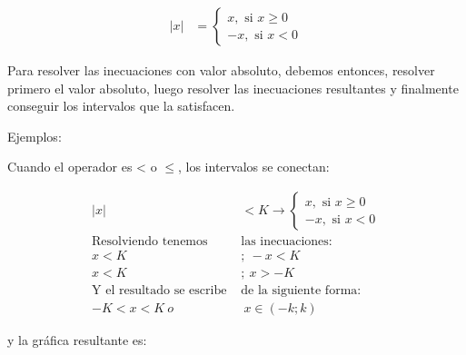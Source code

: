 \documentclass[12pt]{article}
\begin{document}
\begin{align*}
    |x| &=
    \left\lbrace
    \begin{array}{c}
        x, \text{ si }x \geq0\\
        -x, \text{ si }x < 0
    \end{array}
    \right.
\end{align*}


    Para resolver las inecuaciones con valor absoluto, debemos entonces, resolver
    primero el valor absoluto, luego resolver las inecuaciones resultantes y
    finalmente conseguir los intervalos que la satisfacen.

    Ejemplos:

    Cuando el operador es < o $\leq$, los intervalos se conectan:

\begin{align*}
    |x| &<K \rightarrow
    \left\lbrace
    \begin{array}{c}
        x, \text{ si }x \geq0\\
        -x, \text{ si }x < 0
    \end{array}
    \right.\\
    \text{Resolviendo tenemos }& \text{las inecuaciones:}  \\
    x < K\ &; \ -x < K\\
    x < K\ &; \  x > -K\\
    \text{Y el resultado se escribe }& \text{de la siguiente forma:}\\
    -K < x < K\ o&\ x\in (-k;k)
\end{align*}

    y la gráfica resultante es:

    \vspace*{1cm}
\end{document}
